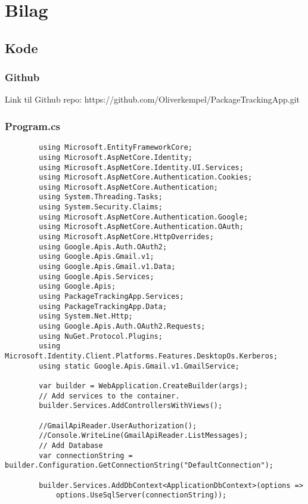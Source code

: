 \chapter{Bilag}
\section{Kode}
\subsection{Github}
Link til Github repo:
https://github.com/Oliverkempel/PackageTrackingApp.git
\subsection{Program.cs}

\begin{verbatim}
        using Microsoft.EntityFrameworkCore;
        using Microsoft.AspNetCore.Identity;
        using Microsoft.AspNetCore.Identity.UI.Services;
        using Microsoft.AspNetCore.Authentication.Cookies;
        using Microsoft.AspNetCore.Authentication;
        using System.Threading.Tasks;
        using System.Security.Claims;
        using Microsoft.AspNetCore.Authentication.Google;
        using Microsoft.AspNetCore.Authentication.OAuth;
        using Microsoft.AspNetCore.HttpOverrides;
        using Google.Apis.Auth.OAuth2;
        using Google.Apis.Gmail.v1;
        using Google.Apis.Gmail.v1.Data;
        using Google.Apis.Services;
        using Google.Apis;
        using PackageTrackingApp.Services;
        using PackageTrackingApp.Data;
        using System.Net.Http;
        using Google.Apis.Auth.OAuth2.Requests;
        using NuGet.Protocol.Plugins;
        using Microsoft.Identity.Client.Platforms.Features.DesktopOs.Kerberos;
        using static Google.Apis.Gmail.v1.GmailService;
        
        var builder = WebApplication.CreateBuilder(args);
        // Add services to the container.
        builder.Services.AddControllersWithViews();
        
        //GmailApiReader.UserAuthorization();
        //Console.WriteLine(GmailApiReader.ListMessages);
        // Add Database 
        var connectionString = builder.Configuration.GetConnectionString("DefaultConnection");
        
        builder.Services.AddDbContext<ApplicationDbContext>(options =>
            options.UseSqlServer(connectionString));
        

\end{verbatim}
